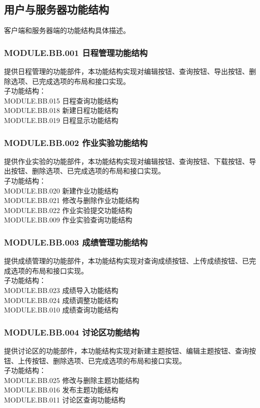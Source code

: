 \subsection{用户与服务器功能结构}

客户端和服务器端的功能结构具体描述。

\subsubsection{MODULE.BB.001    日程管理功能结构}  
提供日程管理的功能部件，本功能结构实现对编辑按钮、查询按钮、导出按钮、删除选项、已完成选项的布局和接口实现。
\\子功能结构：
\\MODULE.BB.015 日程查询功能结构
\\MODULE.BB.018 新建日程功能结构
\\MODULE.BB.019 日程显示功能结构

\subsubsection{MODULE.BB.002    作业实验功能结构}
提供作业实验的功能部件，本功能结构实现对编辑按钮、查询按钮、下载按钮、导出按钮、删除选项、已完成选项的布局和接口实现。
\\子功能结构：
\\MODULE.BB.020 新建作业功能结构   
\\MODULE.BB.021 修改与删除作业功能结构
\\MODULE.BB.022 作业实验提交功能结构 
\\MODULE.BB.009 作业实验查询功能结构

\subsubsection{MODULE.BB.003    成绩管理功能结构}
提供成绩管理的功能部件，本功能结构实现对查询成绩按钮、上传成绩按钮、已完成选项的布局和接口实现。
\\子功能结构：
\\MODULE.BB.023 成绩导入功能结构
\\MODULE.BB.024 成绩调整功能结构
\\MODULE.BB.010 成绩查询功能结构


\subsubsection{MODULE.BB.004    讨论区功能结构}
提供讨论区的功能部件，本功能结构实现对新建主题按钮、编辑主题按钮、查询按钮、上传按钮、删除选项、已完成选项的布局和接口实现。
\\子功能结构：
\\MODULE.BB.025 修改与删除主题功能结构
\\MODULE.BB.016 发布主题功能结构 
\\MODULE.BB.011 讨论区查询功能结构

